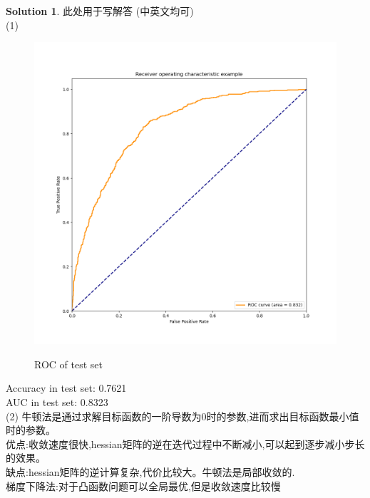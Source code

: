 \documentclass[a4paper,UTF8]{article}
\numberwithin{equation}{section}
\theoremstyle{definition}
\newtheorem*{solution}{Solution}
\begin{document}
\begin{solution}
此处用于写解答 (中英文均可)
~\\
(1) 
\begin{figure}[H]
\centering
\includegraphics[width=\textwidth]{roc.png}\\
\caption{ROC of test set}
\label{fig:roc}
\end{figure}

Accuracy in test set: 0.7621\\
AUC in test set: 0.8323\\
(2)
牛顿法是通过求解目标函数的一阶导数为0时的参数,进而求出目标函数最小值时的参数。\\
优点:收敛速度很快,hessian矩阵的逆在迭代过程中不断减小,可以起到逐步减小步长的效果。\\
缺点:hessian矩阵的逆计算复杂,代价比较大。牛顿法是局部收敛的.\\
梯度下降法:对于凸函数问题可以全局最优,但是收敛速度比较慢

\end{solution}
\end{document}
